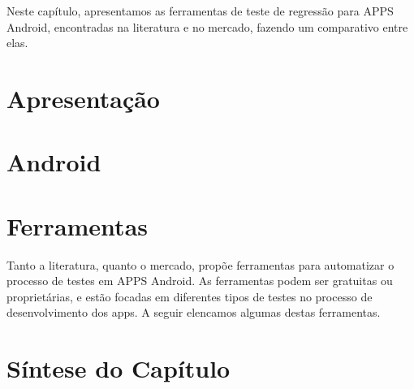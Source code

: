 
Neste capítulo, apresentamos as ferramentas de teste de regressão para \ac{APPS} Android, encontradas na literatura e no mercado, fazendo um comparativo entre elas.

\section{Apresentação}


\section{Android}

\section{Ferramentas}

Tanto a literatura, quanto o mercado, propõe ferramentas para automatizar o processo de testes em \ac{APPS} Android. As ferramentas podem ser gratuitas ou proprietárias, e estão focadas em diferentes tipos de testes no processo de desenvolvimento dos apps. A seguir elencamos algumas destas ferramentas.






\section{Síntese do Capítulo}